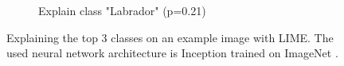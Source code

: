 \begin{figure}[H]
\begin{subfigure}[t]{.23\textwidth}
        \caption{Explain class "Labrador" (p=0.21)}
    \end{subfigure}
    \caption{Explaining the top 3 classes on an example image with LIME. The used neural network architecture is Inception trained on ImageNet \cite{ribeiro2016should}.}
    \label{lime_dog}
\end{figure}
